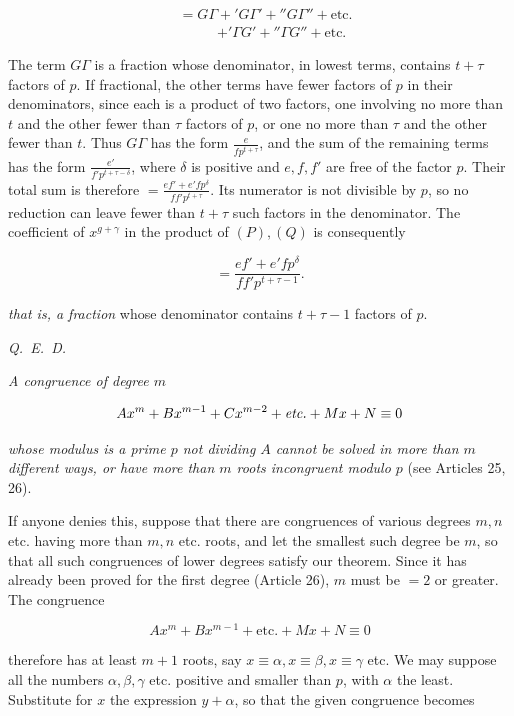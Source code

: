 \[
\begin{aligned}
&=G\varGamma+{}'G\varGamma'+{}''G\varGamma''+\text{etc.}\\
&\phantom{=G\varGamma}\mathord{+}{}'\varGamma G'+{}''\varGamma G''+\text{etc.}
\end{aligned}
\]

The term $G\varGamma$ is a fraction whose denominator, in lowest terms, contains $t+\tau$ factors of $p$. If fractional, the other terms have fewer factors of $p$ in their denominators, since each is a product of two factors, one involving no more than $t$ and the other fewer than $\tau$ factors of $p$, or one no more than $\tau$ and the other fewer than $t$. Thus $G\varGamma$ has the form $\frac{e}{fp^{t+\tau}}$, and the sum of the remaining terms has the form $\frac{e'}{f'p^{t+\tau-\delta}}$, where $\delta$ is positive and $e,f,f'$ are free of the factor $p$. Their total sum is therefore $=\frac{ef'+e'fp^\delta}{ff'p^{t+\tau}}$. Its numerator is not divisible by $p$, so no reduction can leave fewer than $t+\tau$ such factors in the denominator. The coefficient of $x^{g+\gamma}$ in the product of $(P),(Q)$ is consequently

\[=\frac{ef'+e'fp^\delta}{ff'p^{t+\tau-1}}.\]

\noindent\emph{that is, a fraction} whose denominator contains $t+\tau-1$ factors of $p$.\par
\noindent\mbox{\emph{Q. E. D.}}



\emph{A congruence of degree $m$}

\[Ax^m+Bx^{m-1}+Cx^{m-2}+\emph{etc.}+Mx+N\equiv0\]

\noindent\emph{whose modulus is a prime $p$ not dividing $A$ cannot be solved in more than $m$ different ways, or have more than $m$ roots incongruent modulo $p$} (see Articles 25, 26).

If anyone denies this, suppose that there are congruences of various degrees $m,n$ etc. having more than $m,n$ etc. roots, and let the smallest such degree be $m$, so that all such congruences of lower degrees satisfy our theorem. Since it has already been proved for the first degree (Article 26), $m$ must be $=2$ or greater. The congruence

\[Ax^m+Bx^{m-1}+\text{etc.}+Mx+N\equiv0\]

\noindent therefore has at least $m+1$ roots, say $x\equiv\alpha,x\equiv\beta,x\equiv\gamma$ etc. We may suppose all the numbers $\alpha,\beta,\gamma$ etc. positive and smaller than $p$, with $\alpha$ the least. Substitute for $x$ the expression $y+\alpha$, so that the given congruence becomes


